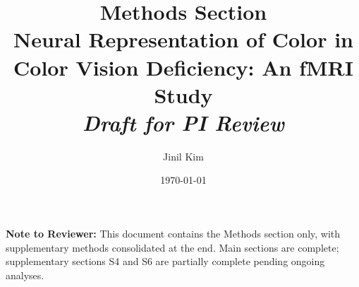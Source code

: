 \documentclass[12pt, a4paper]{article}
\title{\textbf{Methods Section}\\[0.5em]
\large Neural Representation of Color in Color Vision Deficiency: An fMRI Study\\[0.5em]
\normalsize \textit{Draft for PI Review}}
\author{Jinil Kim}
\date{\today}
\begin{document}
\maketitle

\vspace{1em}
\noindent\textbf{Note to Reviewer:} This document contains the Methods section only, with supplementary methods consolidated at the end. Main sections are complete; supplementary sections S4 and S6 are partially complete pending ongoing analyses.

\vspace{2em}



\clearpage
\printbibliography
\end{document}
